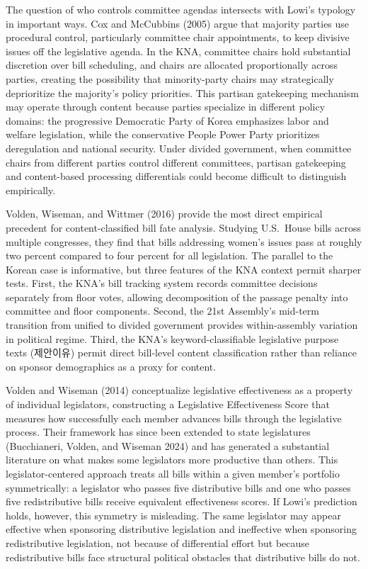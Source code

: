 \documentclass[11pt]{article}
\begin{document}
The question of who controls committee agendas intersects with Lowi's typology in important ways. Cox and McCubbins (2005) argue that majority parties use procedural control, particularly committee chair appointments, to keep divisive issues off the legislative agenda. In the KNA, committee chairs hold substantial discretion over bill scheduling, and chairs are allocated proportionally across parties, creating the possibility that minority-party chairs may strategically deprioritize the majority's policy priorities. This partisan gatekeeping mechanism may operate through content because parties specialize in different policy domains: the progressive Democratic Party of Korea emphasizes labor and welfare legislation, while the conservative People Power Party prioritizes deregulation and national security. Under divided government, when committee chairs from different parties control different committees, partisan gatekeeping and content-based processing differentials could become difficult to distinguish empirically.

Volden, Wiseman, and Wittmer (2016) provide the most direct empirical precedent for content-classified bill fate analysis. Studying U.S.\ House bills across multiple congresses, they find that bills addressing women's issues pass at roughly two percent compared to four percent for all legislation. The parallel to the Korean case is informative, but three features of the KNA context permit sharper tests. First, the KNA's bill tracking system records committee decisions separately from floor votes, allowing decomposition of the passage penalty into committee and floor components. Second, the 21st Assembly's mid-term transition from unified to divided government provides within-assembly variation in political regime. Third, the KNA's keyword-classifiable legislative purpose texts (제안이유) permit direct bill-level content classification rather than reliance on sponsor demographics as a proxy for content.

Volden and Wiseman (2014) conceptualize legislative effectiveness as a property of individual legislators, constructing a Legislative Effectiveness Score that measures how successfully each member advances bills through the legislative process. Their framework has since been extended to state legislatures (Bucchianeri, Volden, and Wiseman 2024) and has generated a substantial literature on what makes some legislators more productive than others. This legislator-centered approach treats all bills within a given member's portfolio symmetrically: a legislator who passes five distributive bills and one who passes five redistributive bills receive equivalent effectiveness scores. If Lowi's prediction holds, however, this symmetry is misleading. The same legislator may appear effective when sponsoring distributive legislation and ineffective when sponsoring redistributive legislation, not because of differential effort but because redistributive bills face structural political obstacles that distributive bills do not.
\end{document}
